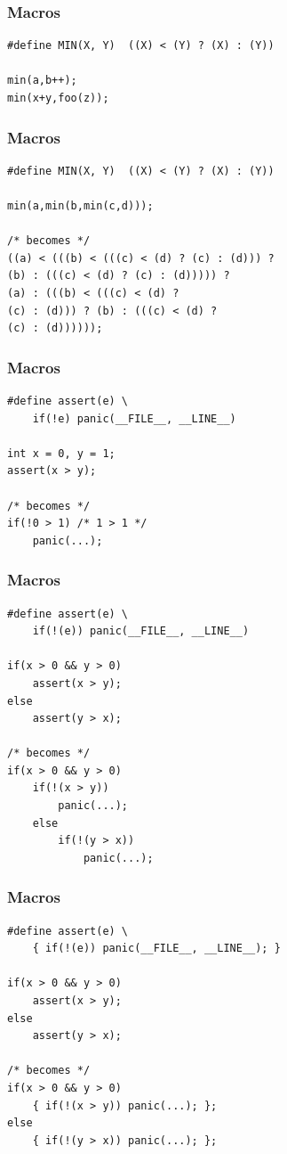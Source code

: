 \documentclass[12pt,compress]{beamer}
\begin{document}
\begin{frame}[fragile]
\frametitle{Macros}

\begin{lstlisting}
#define MIN(X, Y)  ((X) < (Y) ? (X) : (Y))

min(a,b++);
min(x+y,foo(z));
\end{lstlisting}
\end{frame}

\begin{frame}[fragile]
\frametitle{Macros}

\begin{lstlisting}
#define MIN(X, Y)  ((X) < (Y) ? (X) : (Y))

min(a,min(b,min(c,d)));

/* becomes */
((a) < (((b) < (((c) < (d) ? (c) : (d))) ?
(b) : (((c) < (d) ? (c) : (d))))) ?
(a) : (((b) < (((c) < (d) ?
(c) : (d))) ? (b) : (((c) < (d) ?
(c) : (d))))));
\end{lstlisting}
\end{frame}

\begin{frame}[fragile]
\frametitle{Macros}

\begin{lstlisting}
#define assert(e) \
	if(!e) panic(__FILE__, __LINE__)

int x = 0, y = 1;
assert(x > y);

/* becomes */
if(!0 > 1) /* 1 > 1 */
    panic(...);
\end{lstlisting}
\end{frame}


\begin{frame}[fragile]
\frametitle{Macros}

\begin{lstlisting}
#define assert(e) \
	if(!(e)) panic(__FILE__, __LINE__)

if(x > 0 && y > 0)
    assert(x > y);
else
    assert(y > x);

/* becomes */
if(x > 0 && y > 0)
    if(!(x > y))
        panic(...);
    else
        if(!(y > x))
            panic(...);
\end{lstlisting}
\end{frame}


\begin{frame}[fragile]
\frametitle{Macros}

\begin{lstlisting}
#define assert(e) \
	{ if(!(e)) panic(__FILE__, __LINE__); }

if(x > 0 && y > 0)
    assert(x > y);
else
    assert(y > x);

/* becomes */
if(x > 0 && y > 0)
    { if(!(x > y)) panic(...); };
else
    { if(!(y > x)) panic(...); };
\end{lstlisting}
\end{frame}
\end{document}
